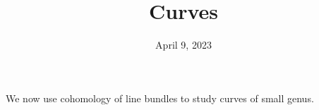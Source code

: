\documentclass[11pt]{amsart}
\title{Curves}
\date{April 9, 2023}
\begin{document}
\maketitle

We now use cohomology of line bundles to study curves of small genus.
\end{document}
